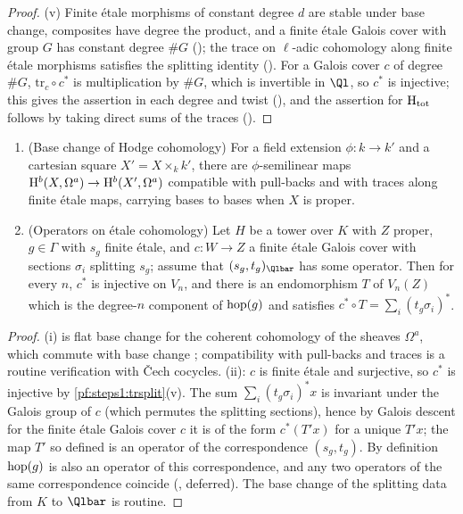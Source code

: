 \begin{proof}
(v) Finite \'etale morphisms of constant degree $d$ are stable under base change, composites have degree the product, and a
finite \'etale Galois cover with group $G$ has constant degree $\#G$ (); the trace
on $\ell$-adic cohomology along finite \'etale morphisms satisfies the splitting identity
(). For a Galois cover $c$ of degree $\#G$, $\mathrm{tr}_c\circ c^*$ is multiplication by
$\#G$, which is invertible in $\Ql$, so $c^*$ is injective; this gives the assertion in each degree and twist
(), and the assertion for $\mathrm{H}_{\mathrm{tot}}$ follows by taking direct sums of the traces
().
\end{proof}

\begin{lemma}\label{pf:steps1:inputs}
\begin{enumerate}[label=\textup{(\roman*)},nosep]
\item \textup{(Base change of Hodge cohomology)} For a field extension $\phi\colon k\to k'$ and a cartesian square
  $X'=X\times_kk'$, there are $\phi$-semilinear maps $\mathrm{H}^b(X,\Omega^a)\to\mathrm{H}^b(X',\Omega^a)$ compatible
  with pull-backs and with traces along finite \'etale maps, carrying bases to bases when $X$ is proper.
\item \textup{(Operators on \'etale cohomology)} Let $H$ be a tower over $K$ with $Z$ proper, $g\in\Gamma$ with $s_g$
  finite \'etale, and $c\colon W\to Z$ a finite \'etale Galois cover with sections $\sigma_i$ splitting $s_g$; assume
  that $(s_g,t_g)_{\Qlbar}$ has some operator. Then for every $n$, $c^*$ is injective on $V_n$, and there is an
  endomorphism $T$ of $V_n(Z)$ which is the degree-$n$ component of $\mathrm{hop}(g)$ and satisfies
  $c^*\circ T=\sum_i(t_g\sigma_i)^*$.
\end{enumerate}
\end{lemma}

\begin{proof}
(i) is flat base change for the coherent cohomology of the sheaves $\Omega^a$, which commute with base
change \cite[III.9.3]{Hartshorne1977}; compatibility with pull-backs and traces is a routine verification
with \v{C}ech cocycles.
(ii): $c$ is finite \'etale and surjective, so $c^*$ is injective by \cref{pf:steps1:trsplit}(v). The sum
$\sum_i(t_g\sigma_i)^*x$ is invariant under the Galois group of $c$ (which permutes the
splitting sections), hence by Galois descent for the finite \'etale Galois cover $c$ it is of the form $c^*(T'x)$ for a
unique $T'x$; the map $T'$ so defined is an operator of the correspondence $(s_g,t_g)$. By definition $\mathrm{hop}(g)$ is
also an operator of this correspondence, and any two operators of the same correspondence coincide
(, deferred). The base change of the splitting data from $K$ to $\Qlbar$ is
routine.
\end{proof}

